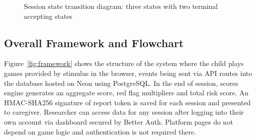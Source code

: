 \documentclass[12pt,a4paper,oneside]{report}
\begin{document}
	\begin{figure}[H]
		\centering
		\caption{Session state transition diagram: three states with two terminal accepting states}
		\label{fig:state}
	\end{figure}
	
	\subsection{Overall Framework and Flowchart}
	
	Figure~\ref{fig:framework} shows the structure of the system where the child plays games provided by stimulus in the browser, events being sent via API routes into the database hosted on Neon using PostgreSQL. In the end of session, scores engine generates an aggregate score, red flag multipliers and total risk score. An HMAC-SHA256 signature of report token is saved for each session and presented to caregiver. Researcher can access data for any session after logging into their own account via dashboard secured by Better Auth. Platform pages do not depend on game logic and authentication is not required there.
	
\end{document}
